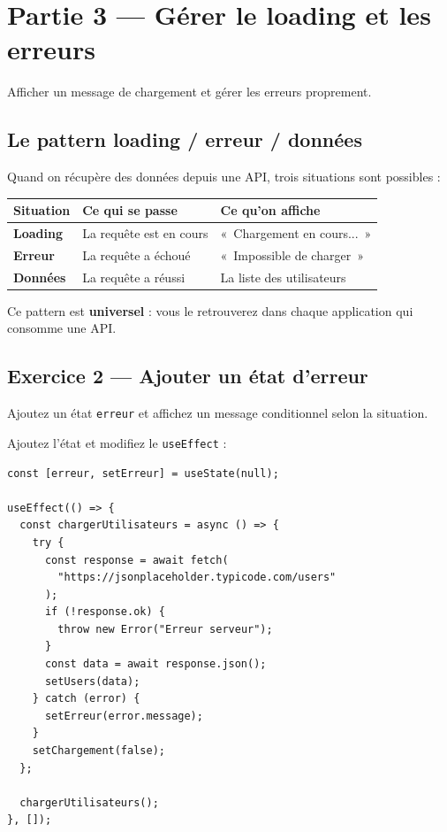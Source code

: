 \documentclass[11pt,a4paper]{article}
\begin{document}
\section{Partie 3 --- Gérer le loading et les erreurs}

\begin{objectifbox}
Afficher un message de chargement et gérer les erreurs proprement.
\end{objectifbox}

\subsection{Le pattern loading / erreur / données}

Quand on récupère des données depuis une API, trois situations sont possibles :

\begin{center}
\begin{tabular}{lp{4cm}p{5cm}}
\toprule
\textbf{Situation} & \textbf{Ce qui se passe} & \textbf{Ce qu'on affiche} \\
\midrule
\textbf{Loading} & La requête est en cours & «~Chargement en cours...~» \\
\textbf{Erreur} & La requête a échoué & «~Impossible de charger~» \\
\textbf{Données} & La requête a réussi & La liste des utilisateurs \\
\bottomrule
\end{tabular}
\end{center}

Ce pattern est \textbf{universel} : vous le retrouverez dans chaque application qui consomme une API.

\subsection{Exercice 2 --- Ajouter un état d'erreur}

\begin{objectifbox}
Ajoutez un état \texttt{erreur} et affichez un message conditionnel selon la situation.
\end{objectifbox}

Ajoutez l'état et modifiez le \texttt{useEffect} :

\begin{lstlisting}
const [erreur, setErreur] = useState(null);

useEffect(() => {
  const chargerUtilisateurs = async () => {
    try {
      const response = await fetch(
        "https://jsonplaceholder.typicode.com/users"
      );
      if (!response.ok) {
        throw new Error("Erreur serveur");
      }
      const data = await response.json();
      setUsers(data);
    } catch (error) {
      setErreur(error.message);
    }
    setChargement(false);
  };

  chargerUtilisateurs();
}, []);
\end{lstlisting}
\end{document}
